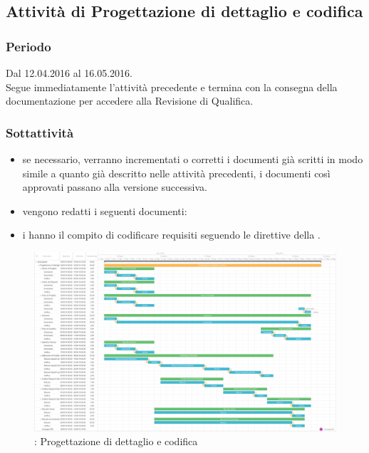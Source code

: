 \documentclass[a4paper, titlepage]{article}
\begin{document}
	\subsection{Attività di Progettazione di dettaglio e codifica }
	\subsubsection{Periodo}
	Dal 12.04.2016 al 16.05.2016.\\
	Segue immediatamente l'attività precedente e termina con la consegna della documentazione per accedere alla Revisione di Qualifica.
	
	
	\subsubsection{Sottattività}
	\begin{itemize}
		\item {} se necessario, verranno incrementati o corretti i documenti già scritti in modo simile a quanto già descritto nelle attività precedenti, i documenti così approvati passano alla versione successiva.
		\item {} vengono redatti i seguenti documenti:
		\item {} i  hanno il compito di codificare  requisiti seguendo le direttive della .		 
	\end{itemize}
	
	\newpage
	\begin{figure}[!ht]
		\includegraphics[scale=0.25]{Img/Grafici_Gantt/Progettazione(dett-cod).pdf}
		\caption{ : Progettazione di dettaglio e codifica}
	\end{figure}
	
\end{document}

